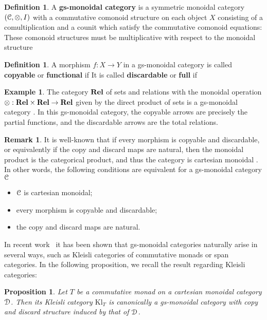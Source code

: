 \documentclass[a4paper,UKenglish,numberwithinsect,cleveref, autoref, thm-restate]{lipics-v2021}
\theoremstyle{plain} %
\newtheorem{myproposition}[mytheorem]{Proposition}
\theoremstyle{definition} %
\newtheorem{mydefinition}[mytheorem]{Definition}
\newtheorem{myremark}[mytheorem]{Remark}
\newtheorem{myexample}[mytheorem]{Example}
\begin{document}
\begin{mydefinition}
A \textbf{gs-monoidal category} is a symmetric monoidal category $(\mathcal{C}, \otimes, I)$
with a commutative comonoid structure on each object $X$ consisting of a comultiplication
and a counit
which satisfy the commutative comonoid equations:
These comonoid structures must be multiplicative with respect to the monoidal structure
\end{mydefinition}


\begin{mydefinition}
 A morphism $f:X\to Y$ in a gs-monoidal category is called \textbf{copyable} or \textbf{functional} if
 It is called \textbf{discardable} or \textbf{full} if 
\end{mydefinition}

\begin{myexample}
The category $\mathbf{Rel}$ of sets and relations with the monoidal operation $\otimes : \mathbf{Rel} \times \mathbf{Rel}\to \mathbf{Rel}$ given by the direct product of sets is a gs-monoidal category \cite{CorradiniGadducci02}. In this gs-monoidal category, the copyable arrows are precisely the partial functions, and the discardable arrows are the total relations.
\end{myexample}

\begin{myremark}\label{cartesiancase}
It is well-known that if every morphism is copyable and discardable, or equivalently if the copy and discard maps are natural, then the monoidal product is the categorical product, and thus the category is cartesian monoidal \cite{Fox:CACC}.
In other words, the following conditions are equivalent for a gs-monoidal category $\mathcal{C}$
 \begin{itemize}
  \item $\mathcal{C}$ is cartesian monoidal;
  \item every morphism is copyable and discardable;
  \item the copy and discard maps are natural.
 \end{itemize}
\end{myremark}

In recent work~\cite{fgtc2022lax} it has been shown that gs-monoidal categories naturally arise in several ways, such as Kleisli categories of commutative monads or span categories. In the following proposition, we recall the result regarding Kleisli categories:

\begin{myproposition}\label{monoidalgs}
 Let $T$ be a commutative monad on a cartesian monoidal category $\mathcal{D}$. 
 Then its Kleisli category $\mathrm{Kl}_T$ is canonically a gs-monoidal category with copy and discard structure induced by that of $\mathcal{D}$.
\end{myproposition}
\end{document}
